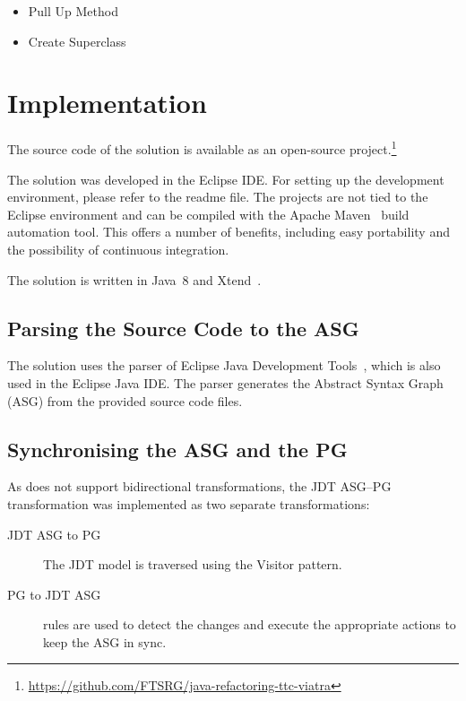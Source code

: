 \documentclass[submission,copyright,creativecommons]{eptcs}
\begin{document}
\begin{itemize}
\item \textsf{Pull Up Method}
\item \textsf{Create Superclass}
\end{itemize}

\section{Implementation}

The source code of the solution is available as an open-source project.\footnote{\url{https://github.com/FTSRG/java-refactoring-ttc-viatra}}

The solution was developed in the Eclipse IDE. For setting up the development environment, please refer to the readme file. The projects are not tied to the Eclipse environment and can be compiled with the Apache Maven~\cite{Maven} build automation tool. This offers a number of benefits, including easy portability and the possibility of continuous integration.

The solution is written in Java~8 and Xtend~\cite{Xtend}.


\subsection{Parsing the Source Code to the ASG}

The solution uses the parser of Eclipse Java Development Tools~\cite{jdt}, which is also used in the Eclipse Java IDE. The parser generates the Abstract Syntax Graph (ASG) from the provided source code files.



\subsection{Synchronising the ASG and the PG}

As \viatra does not support bidirectional transformations, the JDT ASG--PG transformation was implemented as two separate transformations:

\begin{description}
\item[JDT ASG to PG] The JDT model is traversed using the Visitor pattern.
\item[PG to JDT ASG] \viatra rules are used to detect the changes and execute the appropriate actions to keep the ASG in sync.
\end{description}
\end{document}

